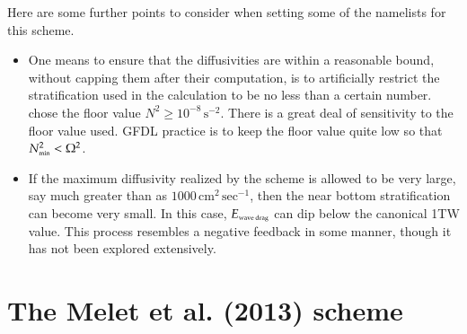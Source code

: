 Here are some further points to consider when setting some of the
namelists for this scheme.
\begin{itemize}

\item One means to ensure that the diffusivities are within a
  reasonable bound, without capping them after their computation, is
  to artificially restrict the stratification used in the calculation
  to be no less than a certain number.  \cite{Simmonsetal2004} chose
  the floor value $N^{2} \ge 10^{-8} \, \mbox{s}^{-2}$.  There is a
  great deal of sensitivity to the floor value used.  GFDL practice is
  to keep the floor value quite low so that $N^{2}_{\mbox{\tiny min}}
  < \Omega^{2}$.

\item If the maximum diffusivity realized by the scheme is allowed to
  be very large, say much greater than as $1000 \, \mbox{cm}^{2} \,
  \mbox{sec}^{-1}$, then the near bottom stratification can become
  very small.  In this case, $E_{\mbox{\tiny wave drag}}$ can dip
  below the canonical 1TW value.  This process resembles a negative
  feedback in some manner, though it has not been explored
  extensively.

\end{itemize}


\section{The Melet et al. (2013) scheme}
\label{section:melet-etal}


